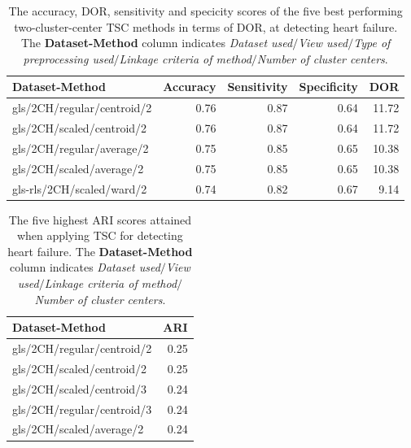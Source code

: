\begin{table}
    \centering
    \begin{tabular}{lrrrr}
        \toprule
        Dataset-Method             &  Accuracy &  Sensitivity &  Specificity & DOR \\
        \midrule
        gls/2CH/regular/centroid/2 &      0.76 &         0.87 &         0.64 & 11.72 \\
        gls/2CH/scaled/centroid/2  &      0.76 &         0.87 &         0.64 & 11.72 \\
        gls/2CH/regular/average/2  &      0.75 &         0.85 &         0.65 & 10.38 \\
        gls/2CH/scaled/average/2   &      0.75 &         0.85 &         0.65 & 10.38 \\
        gls-rls/2CH/scaled/ward/2  &      0.74 &         0.82 &         0.67 &  9.14 \\
        \bottomrule
    \end{tabular}
    \caption{The accuracy, DOR, sensitivity and specicity scores of the five best performing two-cluster-center TSC methods in terms of DOR, at detecting heart failure.
             The \textbf{Dataset-Method} column indicates \textit{Dataset used}$/$\textit{View used}$/$\textit{Type of preprocessing used}$/$\textit{Linkage criteria of method}$/$\textit{Number of cluster centers}.}
    \label{tab:tsc_hf_dor_sens_spec_dist}
\end{table}

\begin{table}[htb]
    \centering
    \begin{tabular}{lr}
        \toprule
        Dataset-Method             &  ARI \\
        \midrule
        gls/2CH/regular/centroid/2 & 0.25 \\
        gls/2CH/scaled/centroid/2  & 0.25 \\
        gls/2CH/scaled/centroid/3  & 0.24 \\
        gls/2CH/regular/centroid/3 & 0.24 \\
        gls/2CH/scaled/average/2   & 0.24 \\
        \bottomrule
    \end{tabular}
    \caption{The five highest ARI scores attained when applying TSC for detecting heart failure.
             The \textbf{Dataset-Method} column indicates \textit{Dataset used}$/$\textit{View used}$/$\textit{Linkage criteria of method}$/$\textit{Number of cluster centers}.}
    \label{tab:tsc_hf_ari}
\end{table}

